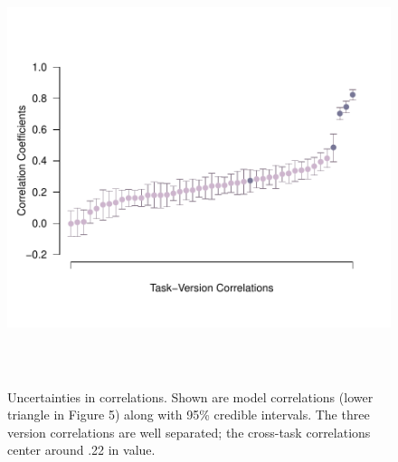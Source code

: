 \documentclass[man, 12pt]{apa7} %
\begin{document}
\begin{figure}
    \centering  %
    \includegraphics[width=6in, height=5in]{_figs/cor-CI.pdf}
    \caption{Uncertainties in correlations.  Shown are model correlations (lower triangle in Figure 5) along with 95\% credible intervals.  The three version correlations are well separated; the cross-task correlations center around .22 in value.}
    \label{fig:ciCorPlots}
\end{figure}
\end{document}
